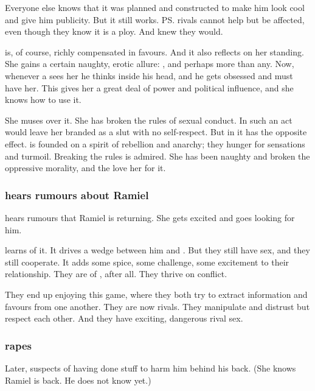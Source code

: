 Everyone else knows that it was planned and constructed to make him look cool and give him publicity. 
But it still works. 
\ps{\Dasteron} rivals cannot help but be affected, even though they know it is a ploy. 
And \Dasteron{} knew they would. 

\Cishiel{} is, of course, richly compensated in favours. 
And it also reflects on her standing. 
She gains a certain naughty, erotic allure: 
, and \Mystraacht{} perhaps more than any.
Now, whenever a \resphan{} sees her he thinks  inside his head, and he gets obsessed and must have her. 
This gives her a great deal of power and political influence, and she knows how to use it. 

She muses over it. 
She has broken the rules of sexual conduct. 
In \CiriathSepher{} such an act would leave her branded as a slut with no self-respect. 
But in \Mystraacht{} it has the opposite effect. 
\Mystraacht{} is founded on a spirit of rebellion and anarchy; they hunger for sensations and turmoil. 
Breaking the rules is admired. 
She has been naughty and broken the oppressive \CiriathSepher{} morality, and the \Mystraacht{} love her for it. 





\subsubsection{\Cishiel{} hears rumours about Ramiel}
\Cishiel{} hears rumours that Ramiel is returning. 
She gets excited and goes looking for him. 

\Dasteron{} learns of it. 
It drives a wedge between him and \Cishiel. 
But they still have sex, and they still cooperate. 
It adds some spice, some challenge, some excitement to their relationship. 
They are \resphain{} of \Mystraacht, after all. 
They thrive on conflict. 

They end up enjoying this game, where they both try to extract information and favours from one another. 
They are now rivals. 
They manipulate and distrust but respect each other. 
And they have exciting, dangerous rival sex. 





\subsubsection{\Dasteron{} rapes \Cishiel}
Later, \Dasteron{} suspects \Cishiel{} of having done stuff to harm him behind his back. 
(She knows Ramiel is back. He does not know yet.) 

